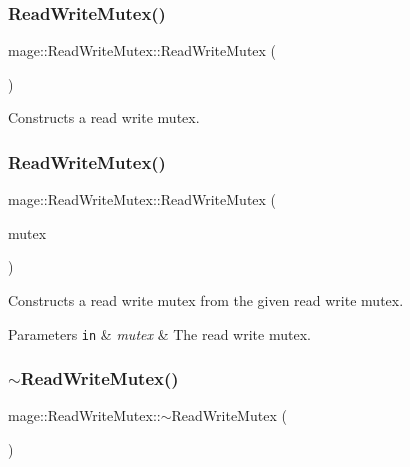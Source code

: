 \subsubsection{\texorpdfstring{Read\+Write\+Mutex()}{ReadWriteMutex()}\hspace{0.1cm}{\footnotesize\ttfamily [1/2]}}
{\footnotesize\ttfamily mage\+::\+Read\+Write\+Mutex\+::\+Read\+Write\+Mutex (\begin{DoxyParamCaption}{ }\end{DoxyParamCaption})\hspace{0.3cm}{\ttfamily [private]}}

Constructs a read write mutex. \hypertarget{classmage_1_1_read_write_mutex_ae58b656dabbee6ccad6d0d89b85bf018}{}\label{classmage_1_1_read_write_mutex_ae58b656dabbee6ccad6d0d89b85bf018} 
\subsubsection{\texorpdfstring{Read\+Write\+Mutex()}{ReadWriteMutex()}\hspace{0.1cm}{\footnotesize\ttfamily [2/2]}}
{\footnotesize\ttfamily mage\+::\+Read\+Write\+Mutex\+::\+Read\+Write\+Mutex (\begin{DoxyParamCaption}\item[{\hyperlink{classmage_1_1_read_write_mutex}{Read\+Write\+Mutex} \&}]{mutex }\end{DoxyParamCaption})\hspace{0.3cm}{\ttfamily [private]}}

Constructs a read write mutex from the given read write mutex.


\begin{DoxyParams}[1]{Parameters}
\mbox{\tt in}  & {\em mutex} & The read write mutex. \\
\hline
\end{DoxyParams}
\hypertarget{classmage_1_1_read_write_mutex_a73676d9414658d63edfe443ee1d55c8b}{}\label{classmage_1_1_read_write_mutex_a73676d9414658d63edfe443ee1d55c8b} 
\subsubsection{\texorpdfstring{$\sim$\+Read\+Write\+Mutex()}{~ReadWriteMutex()}}
{\footnotesize\ttfamily mage\+::\+Read\+Write\+Mutex\+::$\sim$\+Read\+Write\+Mutex (\begin{DoxyParamCaption}{ }\end{DoxyParamCaption})\hspace{0.3cm}{\ttfamily [private]}}

